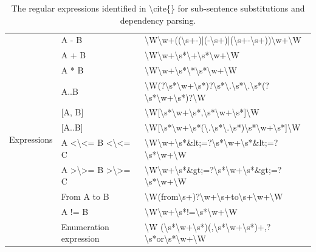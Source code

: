 \begin{table}[h]
\begin{tabular}{|l|l|l|}
		\multirow{11}{*}{Expressions} & A - B & \textbackslash{}W\textbackslash{}w+((\textbackslash{}s+-)|(-\textbackslash{}s+)|(\textbackslash{}s+-\textbackslash{}s+))\textbackslash{}w+\textbackslash{}W \\ \cline{2-3} 
		& A + B & \textbackslash{}W\textbackslash{}w+\textbackslash{}s*\textbackslash{}+\textbackslash{}s*\textbackslash{}w+\textbackslash{}W \\ \cline{2-3} 
		& A * B & \textbackslash{}W\textbackslash{}w+\textbackslash{}s*\textbackslash{}*\textbackslash{}s*\textbackslash{}w+\textbackslash{}W \\ \cline{2-3} 
		& A..B & \textbackslash{}W(?\textbackslash{}s*\textbackslash{}w+\textbackslash{}s*)?\textbackslash{}s*\textbackslash{}.\textbackslash{}s*\textbackslash{}.\textbackslash{}s*(?\textbackslash{}s*\textbackslash{}w+\textbackslash{}s*)?\textbackslash{}W \\ \cline{2-3} 
		& {[}A, B{]} & \textbackslash{}W[\textbackslash{}s*\textbackslash{}w+\textbackslash{}s*,\textbackslash{}s*\textbackslash{}w+\textbackslash{}s*]\textbackslash{}W \\ \cline{2-3} 
		& {[}A..B{]} & \textbackslash{}W[\textbackslash{}s*\textbackslash{}w+\textbackslash{}s*(\textbackslash{}.\textbackslash{}s*\textbackslash{}.\textbackslash{}s*)\textbackslash{}s*\textbackslash{}w+\textbackslash{}s*]\textbackslash{}W \\ \cline{2-3} 
		& A \textless{}\textbackslash{}\textless{}= B \textless{}\textbackslash{}\textless{}= C & \textbackslash{}W\textbackslash{}w+\textbackslash{}s*\&lt;=?\textbackslash{}s*\textbackslash{}w+\textbackslash{}s*\&lt;=?\textbackslash{}s*\textbackslash{}w+\textbackslash{}W \\ \cline{2-3} 
		& A \textgreater{}\textbackslash{}\textgreater{}= B \textgreater{}\textbackslash{}\textgreater{}= C & \textbackslash{}W\textbackslash{}w+\textbackslash{}s*\&gt;=?\textbackslash{}s*\textbackslash{}w+\textbackslash{}s*\&gt;=?\textbackslash{}s*\textbackslash{}w+\textbackslash{}W \\ \cline{2-3} 
		& From A to B & \textbackslash{}W(from\textbackslash{}s+)?\textbackslash{}w+\textbackslash{}s+to\textbackslash{}s+\textbackslash{}w+\textbackslash{}W \\ \cline{2-3} 
		& A != B & \textbackslash{}W\textbackslash{}w+\textbackslash{}s*!=\textbackslash{}s*\textbackslash{}w+\textbackslash{}W \\ \cline{2-3} 
		& Enumeration expression & \textbackslash{}W (\textbackslash{}s*\textbackslash{}w+\textbackslash{}s*)(,\textbackslash{}s*\textbackslash{}w+\textbackslash{}s*)+,?\textbackslash{}s*or\textbackslash{}s*\textbackslash{}w+\textbackslash{}W \\ \hline
	\end{tabular}
	\caption{The regular expressions identified in \textbackslash{}cite\{\} for sub-sentence substitutions and dependency parsing.}
	\label{tab:zhou-regex}
\end{table}

